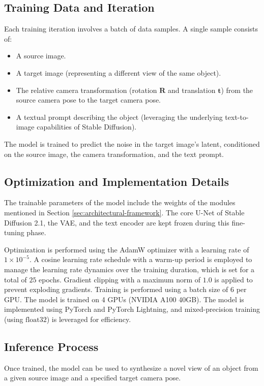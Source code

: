 \subsection{Training Data and Iteration}
Each training iteration involves a batch of data samples. A single sample consists of:
\begin{itemize}
  \item A source image.
  \item A target image (representing a different view of the same object).
  \item The relative camera transformation (rotation $\mathbf{R}$ and translation $\mathbf{t}$) from the source camera pose to the target camera pose.
  \item A textual prompt describing the object (leveraging the underlying text-to-image capabilities of Stable Diffusion).
\end{itemize}
The model is trained to predict the noise in the target image's latent, conditioned on the source image, the camera transformation, and the text prompt.

\subsection{Optimization and Implementation Details}
The trainable parameters of the model include the weights of the modules mentioned in Section \ref{sec:architectural-framework}. The core U-Net of Stable Diffusion 2.1, the VAE, and the text encoder are kept frozen during this fine-tuning phase.

Optimization is performed using the AdamW optimizer \cite{adamw} with a learning rate of $1 \times 10^{-5}$. A cosine learning rate schedule with a warm-up period is employed to manage the learning rate dynamics over the training duration, which is set for a total of $25$ epochs. Gradient clipping with a maximum norm of $1.0$ is applied to prevent exploding gradients. Training is performed using a batch size of $6$ per GPU. The model is trained on 4 GPUs (NVIDIA A100 40GB). The model is implemented using PyTorch and PyTorch Lightning, and mixed-precision training (using $\text{float32}$) is leveraged for efficiency.

\subsection{Inference Process}
Once trained, the model can be used to synthesize a novel view of an object from a given source image and a specified target camera pose.


